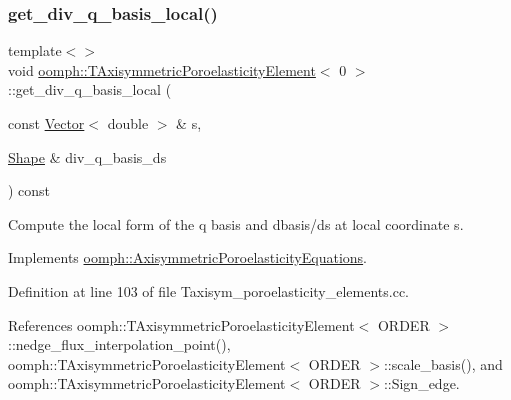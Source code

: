 \subsubsection{\texorpdfstring{get\+\_\+div\+\_\+q\+\_\+basis\+\_\+local()}{get\_div\_q\_basis\_local()}\hspace{0.1cm}{\footnotesize\ttfamily [1/3]}}
{\footnotesize\ttfamily template$<$$>$ \\
void \hyperlink{classoomph_1_1TAxisymmetricPoroelasticityElement}{oomph\+::\+T\+Axisymmetric\+Poroelasticity\+Element}$<$ 0 $>$\+::get\+\_\+div\+\_\+q\+\_\+basis\+\_\+local (\begin{DoxyParamCaption}\item[{const \hyperlink{classoomph_1_1Vector}{Vector}$<$ double $>$ \&}]{s,  }\item[{\hyperlink{classoomph_1_1Shape}{Shape} \&}]{div\+\_\+q\+\_\+basis\+\_\+ds }\end{DoxyParamCaption}) const\hspace{0.3cm}{\ttfamily [virtual]}}



Compute the local form of the q basis and dbasis/ds at local coordinate s. 



Implements \hyperlink{classoomph_1_1AxisymmetricPoroelasticityEquations_abe3e6e28eb58ae719a6180d0d57b1815}{oomph\+::\+Axisymmetric\+Poroelasticity\+Equations}.



Definition at line 103 of file Taxisym\+\_\+poroelasticity\+\_\+elements.\+cc.



References oomph\+::\+T\+Axisymmetric\+Poroelasticity\+Element$<$ O\+R\+D\+E\+R $>$\+::nedge\+\_\+flux\+\_\+interpolation\+\_\+point(), oomph\+::\+T\+Axisymmetric\+Poroelasticity\+Element$<$ O\+R\+D\+E\+R $>$\+::scale\+\_\+basis(), and oomph\+::\+T\+Axisymmetric\+Poroelasticity\+Element$<$ O\+R\+D\+E\+R $>$\+::\+Sign\+\_\+edge.

\mbox{\label{classoomph_1_1TAxisymmetricPoroelasticityElement_af452f0a776720636babc94bf1205f5ca}} 
